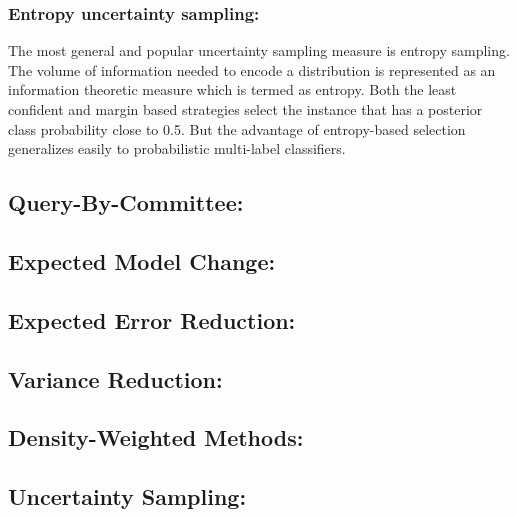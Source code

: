 \subsubsection{Entropy uncertainty sampling:}   
	The most general and popular uncertainty sampling measure is entropy sampling. The volume of information needed to encode a distribution is represented as an information theoretic measure which is termed as entropy. Both the least confident and margin based strategies select the instance that has a posterior class probability close to 0.5. But the advantage of entropy-based selection generalizes easily to probabilistic multi-label classifiers. \cite{Settles2010}\cite{modal}
	
\subsection{Query-By-Committee:}
\subsection{Expected Model Change:}
\subsection{Expected Error Reduction:}
\subsection{Variance Reduction:}
\subsection{Density-Weighted Methods:}
\subsection{Uncertainty Sampling:}